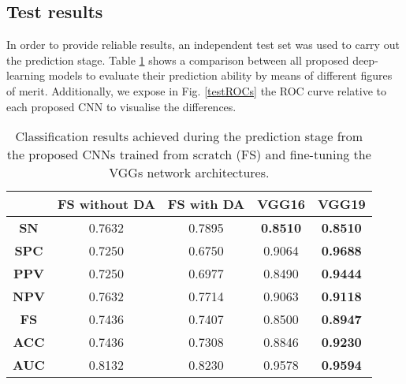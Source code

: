 
\subsection{Test results}
 
In order to provide reliable results, an independent test set was used to carry out the prediction stage. Table \ref{testResults} shows a comparison between all proposed deep-learning models to evaluate their prediction ability by means of different figures of merit. Additionally, we expose in Fig. \ref{testROCs} the ROC curve relative to each proposed CNN to visualise the differences.

\begin{table}[h]
\caption{Classification results achieved during the prediction stage from the proposed CNNs trained from scratch (FS) and fine-tuning the VGGs network architectures.}
\label{testResults}
\small
\begin{center}
\begin{tabular}{ccccc}
\hline
\multicolumn{1}{l}{}{} & \textbf{FS without DA}       & \textbf{FS with DA}  & \textbf{VGG16}       & \textbf{VGG19}\\
\hline
\textbf{SN}          & 0.7632           & 0.7895    & \textbf{0.8510}       & \textbf{0.8510}  \\
\textbf{SPC}         & 0.7250           & 0.6750    & 0.9064                & \textbf{0.9688} \\
\textbf{PPV}         & 0.7250           & 0.6977    & 0.8490                & \textbf{0.9444}   \\
\textbf{NPV}         & 0.7632           & 0.7714    & 0.9063                & \textbf{0.9118}   \\
\textbf{FS}          & 0.7436           & 0.7407    & 0.8500                & \textbf{0.8947}    \\
\textbf{ACC}         & 0.7436           & 0.7308     & 0.8846               & \textbf{0.9230}   \\
\textbf{AUC}         & 0.8132           & 0.8230     & 0.9578               & \textbf{0.9594} \\
\hline
\end{tabular}
\end{center}
\end{table}


